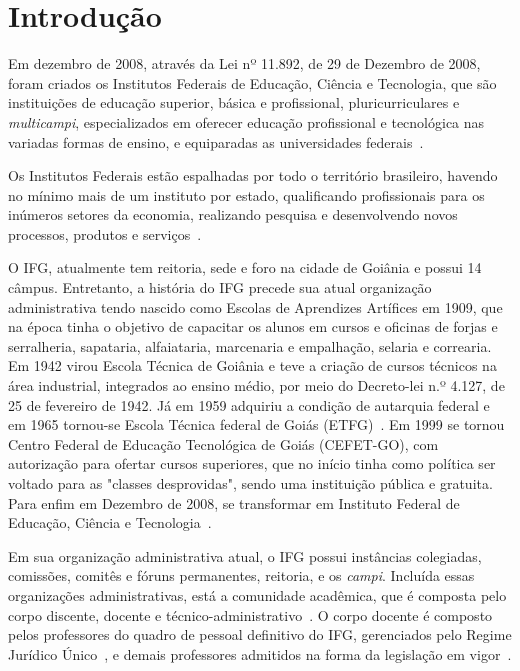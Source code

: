 \chapter{Introdução}
\label{chp:introducao}

Em dezembro de 2008, através da Lei nº 11.892, de 29 de Dezembro de 2008, foram criados os  Institutos Federais de Educação, Ciência e Tecnologia, que são instituições de educação superior, básica e profissional, pluricurriculares e \textit{multicampi}, especializados em oferecer educação profissional e tecnológica nas variadas formas de ensino, e equiparadas as universidades federais~\citep{lei11892}.

Os Institutos Federais estão espalhadas por todo o território brasileiro, havendo no mínimo mais de um instituto por estado, qualificando profissionais para os inúmeros setores da economia, realizando pesquisa e desenvolvendo novos processos, produtos e serviços~\citep{historiaif}. 

O \acf{IFG}, atualmente tem reitoria, sede e foro na cidade de Goiânia e possui 14 câmpus.
Entretanto, a história do IFG precede sua atual organização administrativa tendo nascido como Escolas de Aprendizes Artífices em 1909, que na época tinha o objetivo de capacitar os alunos em cursos e oficinas de forjas e serralheria, sapataria, alfaiataria, marcenaria e empalhação, selaria e correaria. 
Em 1942 virou Escola Técnica de Goiânia e teve a criação de cursos técnicos na área industrial, integrados ao ensino médio, por meio do Decreto-lei n.º 4.127, de 25 de fevereiro de 1942. 
Já em 1959 adquiriu a condição de autarquia federal e em 1965 tornou-se Escola Técnica federal de Goiás (ETFG)~\citep{historiaifg}. 
Em 1999 se tornou Centro Federal de Educação Tecnológica de Goiás (CEFET-GO), com autorização para ofertar cursos superiores, que no início tinha como política ser voltado para as "classes desprovidas", sendo uma instituição pública e gratuita. Para enfim em Dezembro de 2008, se transformar em Instituto Federal de Educação, Ciência e Tecnologia~\citep{historiaif}. 

Em sua organização administrativa atual, o IFG possui instâncias colegiadas, comissões, comitês e fóruns permanentes, reitoria, e os \textit{campi}. 
Incluída essas organizações administrativas, está a comunidade acadêmica, que é composta pelo corpo discente, docente e técnico-administrativo~\citep{regimentoifg}.
O corpo docente é composto pelos professores do quadro de pessoal definitivo do IFG, gerenciados pelo Regime Jurídico Único~\citep{brasil1990lei}, e demais professores admitidos na forma da legislação em vigor~\citep{regimentoifg}.

